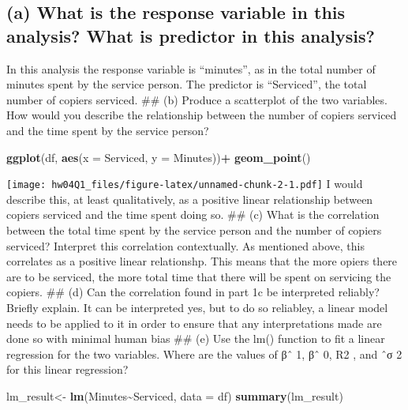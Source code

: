 \documentclass[
]{article}
\newenvironment{Shaded}{\begin{snugshade}}{\end{snugshade}}
\newcommand{\AttributeTok}[1]{\textcolor[rgb]{0.13,0.29,0.53}{#1}}
\newcommand{\FunctionTok}[1]{\textcolor[rgb]{0.13,0.29,0.53}{\textbf{#1}}}
\newcommand{\NormalTok}[1]{#1}
\newcommand{\OtherTok}[1]{\textcolor[rgb]{0.56,0.35,0.01}{#1}}
\newcommand{\SpecialCharTok}[1]{\textcolor[rgb]{0.81,0.36,0.00}{\textbf{#1}}}
\begin{document}
\subsection{(a) What is the response variable in this analysis? What is
predictor in this
analysis?}\label{a-what-is-the-response-variable-in-this-analysis-what-is-predictor-in-this-analysis}

In this analysis the response variable is ``minutes'', as in the total
number of minutes spent by the service person. The predictor is
``Serviced'', the total number of copiers serviced. \#\# (b) Produce a
scatterplot of the two variables. How would you describe the
relationship between the number of copiers serviced and the time spent
by the service person?

\begin{Shaded}
\begin{Highlighting}[]
\FunctionTok{ggplot}\NormalTok{(df, }\FunctionTok{aes}\NormalTok{(}\AttributeTok{x =}\NormalTok{ Serviced, }\AttributeTok{y =}\NormalTok{ Minutes))}\SpecialCharTok{+}
  \FunctionTok{geom\_point}\NormalTok{()}
\end{Highlighting}
\end{Shaded}

\texttt{[image: hw04Q1\_files/figure-latex/unnamed-chunk-2-1.pdf]} I
would describe this, at least qualitatively, as a positive linear
relationship between copiers serviced and the time spent doing so. \#\#
(c) What is the correlation between the total time spent by the service
person and the number of copiers serviced? Interpret this correlation
contextually. As mentioned above, this correlates as a positive linear
relationshp. This means that the more opiers there are to be serviced,
the more total time that there will be spent on servicing the copiers.
\#\# (d) Can the correlation found in part 1c be interpreted reliably?
Briefly explain. It can be interpreted yes, but to do so reliabley, a
linear model needs to be applied to it in order to ensure that any
interpretations made are done so with minimal human bias \#\# (e) Use
the lm() function to fit a linear regression for the two variables.
Where are the values of βˆ 1, βˆ 0, R2 , and ˆσ 2 for this linear
regression?

\begin{Shaded}
\begin{Highlighting}[]
\NormalTok{lm\_result}\OtherTok{\textless{}{-}} \FunctionTok{lm}\NormalTok{(Minutes}\SpecialCharTok{\textasciitilde{}}\NormalTok{Serviced, }\AttributeTok{data =}\NormalTok{ df)}
\FunctionTok{summary}\NormalTok{(lm\_result)}
\end{Highlighting}
\end{Shaded}
\end{document}
